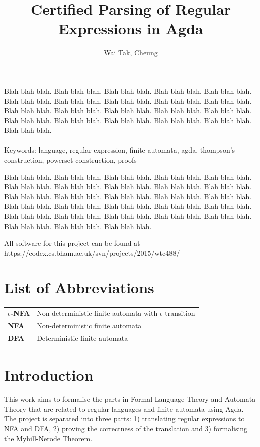 \documentclass[twoside,openright,final]{bhamthesis}
\title{Certified Parsing of Regular Expressions in Agda}
\author{Wai Tak, Cheung}
\begin{document}
\maketitle

\abstract
\par Blah blah blah. Blah blah blah. Blah blah blah. Blah blah blah. Blah
blah blah. Blah blah blah. Blah blah blah. Blah blah blah.
Blah blah blah. Blah blah blah. Blah blah blah. Blah blah blah. Blah
blah blah.
Blah blah blah. Blah blah blah. Blah blah blah. Blah blah blah.
Blah blah blah. Blah blah blah. Blah blah blah. Blah blah blah. \\ \\
Keywords: language, regular expression, finite automata, agda,
thompson's construction, powerset construction, proofs

\acknowledgments
\par Blah blah blah. Blah blah blah. Blah blah blah. Blah blah blah. Blah
blah blah. Blah blah blah. Blah blah blah.
Blah blah blah. Blah blah blah. Blah blah blah.
Blah blah blah. Blah blah blah. Blah blah blah. Blah blah blah. Blah
blah blah. Blah blah blah. Blah blah blah.
Blah blah blah. Blah blah blah. Blah blah blah. Blah blah blah. Blah
blah blah. Blah blah blah.
Blah blah blah. Blah blah blah. Blah blah blah. Blah blah blah. Blah
blah blah.

\repository
\vspace{7cm}
\begin{center}
  All software for this project can be found at \\
  https://codex.cs.bham.ac.uk/svn/projects/2015/wtc488/
\end{center}

\newpage
\tableofcontents
\newpage

\section{List of Abbreviations}
\begin{tabular}{ll}
  \textbf{\(\epsilon\)-NFA} & Non-deterministic finite automata with
                              \(\epsilon\)-transition \\
  \textbf{NFA} & Non-deterministic finite automata \\
  \textbf{DFA} & Deterministic finite automata 
\end{tabular}

\section{Introduction}
This work aims to formalise the parts in Formal Language Theory and
Automata Theory that are related to regular languages and finite automata
using Agda. The project is separated into three parts: 1) translating
regular expressions to NFA and DFA, 2) proving the correctness of
the translation and 3) formalising the Myhill-Nerode Theorem.
\end{document}
